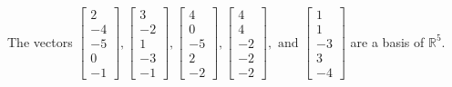\begin{exercise}
\begin{exerciseStatement}
  \end{exerciseStatement}
  \begin{exerciseAnswer}
   The vectors \(\left[\begin{array}{r}
2 \\
-4 \\
-5 \\
0 \\
-1
\end{array}\right] , \left[\begin{array}{r}
3 \\
-2 \\
1 \\
-3 \\
-1
\end{array}\right] , \left[\begin{array}{r}
4 \\
0 \\
-5 \\
2 \\
-2
\end{array}\right] , \left[\begin{array}{r}
4 \\
4 \\
-2 \\
-2 \\
-2
\end{array}\right] , \text{ and } \left[\begin{array}{r}
1 \\
1 \\
-3 \\
3 \\
-4
\end{array}\right]\) 
  	 are  a basis of \(\mathbb{R}^5\).
  


  \end{exerciseAnswer}
\end{exercise}